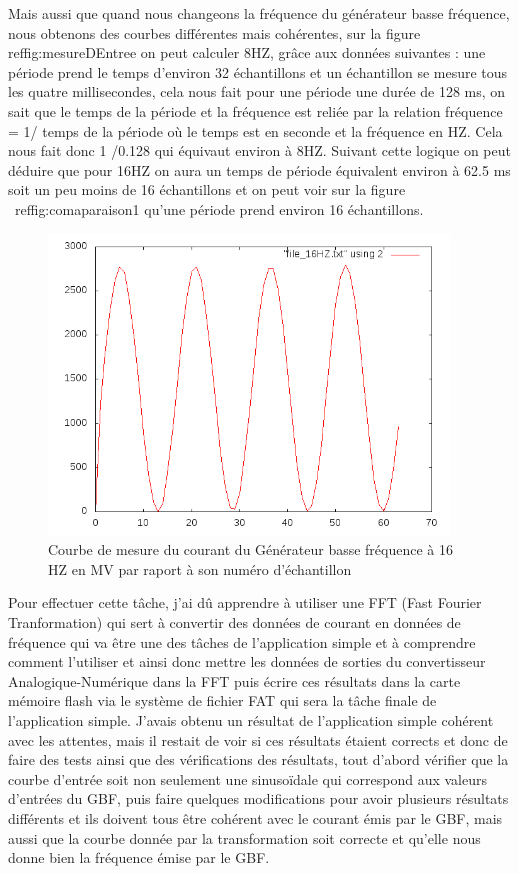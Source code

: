 \documentclass[a4paper]{article}
\begin{document}
Mais aussi que quand nous changeons la fréquence du générateur basse fréquence, nous obtenons des courbes différentes mais cohérentes, sur la figure ref{fig:mesureDEntree} on peut calculer 8HZ, grâce aux données suivantes : une période prend le temps d'environ 32 échantillons et un échantillon se mesure tous les quatre millisecondes, cela nous fait pour une période une durée de 128 ms, on sait que le temps de la période et la fréquence est reliée par la relation fréquence = 1/ temps de la période où le temps est en seconde et la fréquence en HZ. Cela nous fait donc 1 /0.128 qui équivaut environ à 8HZ. Suivant cette logique on peut déduire que pour 16HZ on aura un temps de période équivalent environ à 62.5 ms soit un peu moins de 16 échantillons et on peut voir sur la figure ~ref{fig:comaparaison1} qu'une période prend environ 16 échantillons.
                                                                             
\begin{figure}[H]
\centering
\includegraphics[width=0.95\textwidth]{input16HZ.png}
\caption{\label{fig:comaparaison1}Courbe de mesure du courant du Générateur basse fréquence à 16 HZ en MV par raport à son numéro d'échantillon}
\end{figure}

Pour effectuer cette tâche, j'ai dû apprendre à utiliser une FFT (Fast Fourier Tranformation) qui sert à convertir des données de courant en données de fréquence qui va être une des tâches de l'application simple et à comprendre comment l'utiliser et ainsi donc mettre les données de sorties du convertisseur Analogique-Numérique dans la FFT puis écrire ces résultats dans la carte mémoire flash via le système de fichier FAT qui sera la tâche finale de l'application simple. J'avais obtenu un résultat  de l'application simple cohérent avec les attentes, mais il restait de voir si ces résultats étaient corrects et donc de faire des tests ainsi que des vérifications des résultats, tout d'abord vérifier que la courbe d'entrée soit non seulement une sinusoïdale qui correspond aux valeurs d'entrées du GBF, puis faire quelques modifications pour avoir plusieurs résultats différents et ils doivent tous être cohérent avec le courant émis par le GBF, mais aussi que la courbe donnée par la transformation soit correcte et qu'elle nous donne bien la fréquence émise par le GBF.
\end{document}
